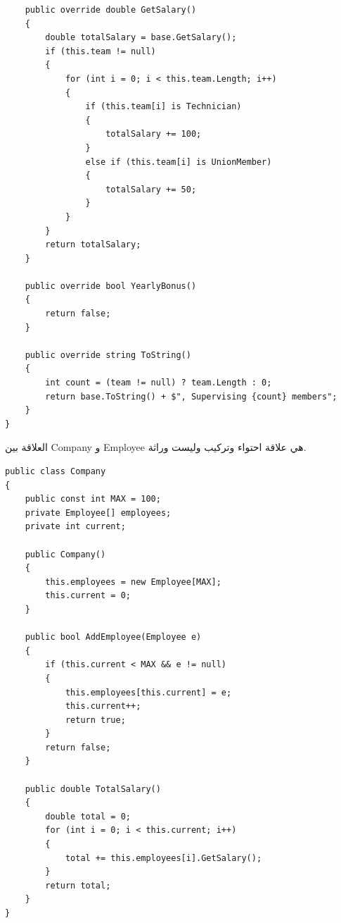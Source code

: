 \documentclass[14pt]{extarticle}
\begin{document}
\clearpage

\begin{boxSolution}
{\small
\begin{english}
\begin{verbatim}
    public override double GetSalary()
    {
        double totalSalary = base.GetSalary();
        if (this.team != null)
        {
            for (int i = 0; i < this.team.Length; i++)
            {
                if (this.team[i] is Technician)
                {
                    totalSalary += 100;
                }
                else if (this.team[i] is UnionMember)
                {
                    totalSalary += 50;
                }
            }
        }
        return totalSalary;
    }

    public override bool YearlyBonus()
    {
        return false;
    }

    public override string ToString()
    {
        int count = (team != null) ? team.Length : 0;
        return base.ToString() + $", Supervising {count} members";
    }
}
\end{verbatim}
\end{english}
}
\end{boxSolution}

\clearpage

\begin{boxSolution}
العلاقة بين \textenglish{Company} و \textenglish{Employee} هي علاقة احتواء وتركيب وليست وراثة.
{\small
\begin{english}
\begin{verbatim}
public class Company
{
    public const int MAX = 100;
    private Employee[] employees;
    private int current;

    public Company()
    {
        this.employees = new Employee[MAX];
        this.current = 0;
    }

    public bool AddEmployee(Employee e)
    {
        if (this.current < MAX && e != null)
        {
            this.employees[this.current] = e;
            this.current++;
            return true;
        }
        return false;
    }

    public double TotalSalary()
    {
        double total = 0;
        for (int i = 0; i < this.current; i++)
        {
            total += this.employees[i].GetSalary();
        }
        return total;
    }
}
\end{verbatim}
\end{english}
}
\end{boxSolution}
\end{document}
